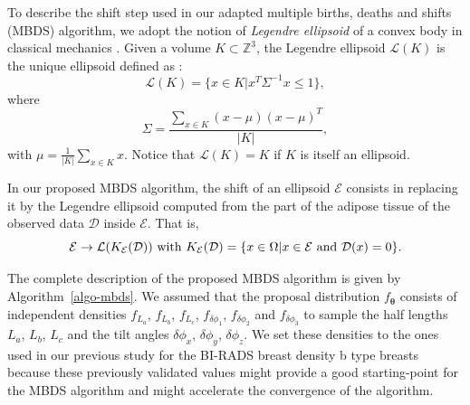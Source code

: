 \documentclass[journal]{IEEEtran}
\begin{document}
To describe the shift step used in our adapted multiple births, deaths
and shifts (MBDS) algorithm, we adopt the notion of \textit{Legendre
  ellipsoid} of a convex body in classical mechanics
\cite{lutwak2000new}. Given a volume $K \subset \mathbb{Z}^3$, the
Legendre ellipsoid $\mathcal{L}(K)$ is the unique ellipsoid defined as
\cite{ludwig2003ellipsoids}:
\begin{equation}
  \label{eq:legendre-ellip-orig}
  \mathcal{L}(K) = \{ x \in K | x^T \Sigma^{-1} x \leq 1 \},
\end{equation}
where
\begin{equation}
  \label{eq:legendre-ellip-cov}
  \Sigma = \frac{\sum_{x \in K} (x - \mu)(x - \mu)^T} {|K|},
\end{equation}
with $\mu = \frac{1}{|K|} \sum_{x \in K} x$. Notice that
$\mathcal{L}(K) = K$ if $K$ is itself an ellipsoid.

In our proposed MBDS algorithm, the shift of an ellipsoid
$\mathcal{E}$ consists in replacing it by the Legendre ellipsoid
computed from the part of the adipose tissue of the observed data
$\mathcal{D}$ inside $\mathcal{E}$. That is,
\begin{equation}
  \label{eq:legendre-ellip}
  \mathcal{E} \rightarrow \mathcal{L}(K_{\mathcal{E}}(\mathcal{D}))
  \textnormal{ with } K_{\mathcal{E}}(\mathcal{D}) = \{x \in
  \Omega | x \in \mathcal{E} \textnormal{ and } \mathcal{D}(x) = 0 \}.
\end{equation}

The complete description of the proposed MBDS algorithm is given by
Algorithm~\ref{algo-mbds}. We assumed that the proposal distribution
$f_{\boldsymbol{\theta}}$ consists of independent densities $f_{L_a}$,
$f_{L_b}$, $f_{L_c}$, $f_{\delta{\phi_1}}$, $f_{\delta{\phi_2}}$ and
$f_{\delta{\phi_3}}$ to sample the half lengths $L_a$, $L_b$, $L_c$
and the tilt angles $\delta{\phi_x}$, $\delta{\phi_y}$,
$\delta{\phi_z}$. We set these densities to the ones used in our
previous study \cite{li2016novel} for the BI-RADS breast density b
type breasts because these previously validated values might provide a
good starting-point for the MBDS algorithm and might accelerate the
convergence of the algorithm.
\end{document}
